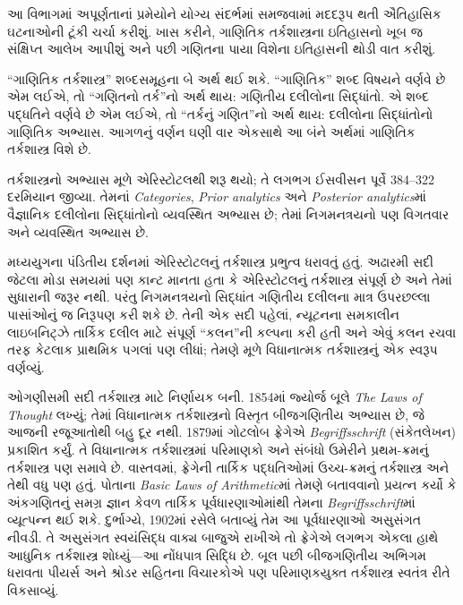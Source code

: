 \documentclass[../../../include/open-logic-section]{subfiles}
\begin{document}


આ વિભાગમાં અપૂર્ણતાનાં પ્રમેયોને યોગ્ય સંદર્ભમાં સમજવામાં
મદદરૂપ થતી ઐતિહાસિક ઘટનાઓની ટૂંકી ચર્ચા કરીશું.
ખાસ કરીને, ગાણિતિક તર્કશાસ્ત્રના ઇતિહાસનો ખૂબ જ
સંક્ષિપ્ત આલેખ આપીશું અને પછી ગણિતના પાયા વિશેના
ઇતિહાસની થોડી વાત કરીશું.

\begin{digress}
  ``ગાણિતિક તર્કશાસ્ત્ર'' શબ્દસમૂહના બે અર્થ થઈ શકે.
  ``ગાણિતિક'' શબ્દ વિષયને વર્ણવે છે એમ લઈએ, તો
  ``ગણિતનો તર્ક''નો અર્થ થાય: ગણિતીય દલીલોના સિદ્ધાંતો.
  એ શબ્દ પદ્ધતિને વર્ણવે છે એમ લઈએ, તો ``તર્કનું ગણિત''નો
  અર્થ થાય: દલીલોના સિદ્ધાંતોનો ગાણિતિક અભ્યાસ.
  આગળનું વર્ણન ઘણી વાર એકસાથે આ બંને અર્થમાં ગાણિતિક
  તર્કશાસ્ત્ર વિશે છે.
\end{digress}

તર્કશાસ્ત્રનો અભ્યાસ મૂળે એરિસ્ટોટલથી શરૂ થયો; તે
લગભગ ઈસવીસન પૂર્વે 384--322 દરમિયાન જીવ્યા.
તેમનાં \emph{Categories}, \emph{Prior
  analytics} અને \emph{Posterior analytics}માં
વૈજ્ઞાનિક દલીલોના સિદ્ધાંતોનો વ્યવસ્થિત અભ્યાસ છે;
તેમાં નિગમનત્રયનો પણ વિગતવાર અને વ્યવસ્થિત અભ્યાસ છે.

મધ્યયુગના પંડિતીય દર્શનમાં એરિસ્ટોટલનું તર્કશાસ્ત્ર
પ્રભુત્વ ધરાવતું હતું. અઢારમી સદી જેટલા મોડા સમયમાં પણ
કાન્ટ માનતા હતા કે એરિસ્ટોટલનું તર્કશાસ્ત્ર સંપૂર્ણ છે
અને તેમાં સુધારાની જરૂર નથી. પરંતુ નિગમનત્રયનો સિદ્ધાંત
ગણિતીય દલીલના માત્ર ઉપરછલ્લા પાસાંઓનું જ નિરૂપણ કરી
શકે છે. તેની એક સદી પહેલાં, ન્યૂટનના સમકાલીન લાઇબનિટ્ઝે
તાર્કિક દલીલ માટે સંપૂર્ણ ``કલન''ની કલ્પના કરી હતી અને
એવું કલન રચવા તરફ કેટલાક પ્રાથમિક પગલાં પણ લીધાં;
તેમણે મૂળે વિધાનાત્મક તર્કશાસ્ત્રનું એક સ્વરૂપ વર્ણવ્યું.

ઓગણીસમી સદી તર્કશાસ્ત્ર માટે નિર્ણાયક બની. 1854માં
જ્યોર્જ બૂલે \emph{The Laws of Thought} લખ્યું;
તેમાં વિધાનાત્મક તર્કશાસ્ત્રનો વિસ્તૃત બીજગણિતીય અભ્યાસ
છે, જે આજની રજૂઆતોથી બહુ દૂર નથી. 1879માં ગોટલોબ
ફ્રેગેએ \emph{Begriffsschrift} (સંકેતલેખન) પ્રકાશિત
કર્યું. તે વિધાનાત્મક તર્કશાસ્ત્રમાં પરિમાણકો અને સંબંધો
ઉમેરીને પ્રથમ-ક્રમનું તર્કશાસ્ત્ર પણ સમાવે છે. વાસ્તવમાં,
ફ્રેગેની તાર્કિક પદ્ધતિઓમાં ઉચ્ચ-ક્રમનું તર્કશાસ્ત્ર અને
તેથી વધુ પણ હતું. પોતાના \emph{Basic Laws of
  Arithmetic}માં તેમણે બતાવવાનો પ્રયત્ન કર્યો કે
અંકગણિતનું સમગ્ર જ્ઞાન કેવળ તાર્કિક પૂર્વધારણાઓમાંથી
તેમના \emph{Begriffsschrift}માં વ્યૂત્પન્ન થઈ શકે.
દુર્ભાગ્યે, 1902માં રસેલે બતાવ્યું તેમ આ પૂર્વધારણાઓ
અસુસંગત નીવડી. તે અસુસંગત સ્વયંસિદ્ધ વાક્ય બાજુએ
રાખીએ તો ફ્રેગેએ લગભગ એકલા હાથે આધુનિક તર્કશાસ્ત્ર
શોધ્યું—આ નોંધપાત્ર સિદ્ધિ છે. બૂલ પછી બીજગણિતીય
અભિગમ ધરાવતા પીયર્સ અને શ્રોડર સહિતના વિચારકોએ પણ
પરિમાણકયુક્ત તર્કશાસ્ત્ર સ્વતંત્ર રીતે વિકસાવ્યું.
\end{document}
